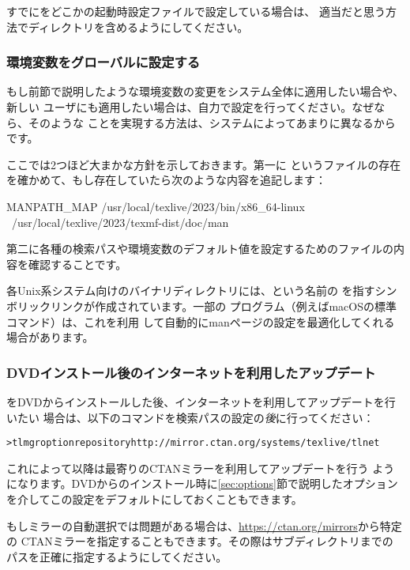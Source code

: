 \documentclass[uplatex,dvipdfmx]{jsarticle}
\begin{document}
すでにをどこかの起動時設定ファイルで設定している場合は、
適当だと思う方法で\TL ディレクトリを含めるようにしてください。

\subsubsection{環境変数をグローバルに設定する}
\label{sec:envglobal}

もし前節で説明したような環境変数の変更をシステム全体に適用したい場合や、新しい
ユーザにも適用したい場合は、自力で設定を行ってください。なぜなら、そのような
ことを実現する方法は、システムによってあまりに異なるからです。

ここでは2つほど大まかな方針を示しておきます。第一に%
というファイルの存在を確かめて、もし存在していたら次のような内容を追記します：
%
\begin{sverbatim}
MANPATH_MAP /usr/local/texlive/2023/bin/x86_64-linux \
            /usr/local/texlive/2023/texmf-dist/doc/man
\end{sverbatim}
%
第二に各種の検索パスや環境変数のデフォルト値を設定するためのファイルの内容を確認することです。

各Unix系システム向けのバイナリディレクトリには、という名前の
を指すシンボリックリンクが作成されています。一部の
プログラム（例えばmacOSの標準コマンド）は、これを利用
して自動的にmanページの設定を最適化してくれる場合があります。

\subsubsection{DVDインストール後のインターネットを利用したアップデート}
\label{sec:dvd-install-net-updates}

\TL をDVDからインストールした後、インターネットを利用してアップデートを行いたい
場合は、以下のコマンドを検索パスの設定の\emph{後}に行ってください：
%
\begin{alltt}
> tlmgr option repository http://mirror.ctan.org/systems/texlive/tlnet
\end{alltt}
%
これによって以降は最寄りのCTANミラーを利用してアップデートを行う
ようになります。DVDからのインストール時に\ref{sec:options}節で説明したオプション
を介してこの設定をデフォルトにしておくこともできます。

もしミラーの自動選択では問題がある場合は、\url{https://ctan.org/mirrors}から特定の
CTANミラーを指定することもできます。その際はサブディレクトリまでの
パスを正確に指定するようにしてください。
\end{document}
